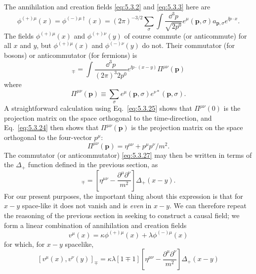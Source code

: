 The annihilation and creation fields \eqref{eq:5.3.2} and \eqref{eq:5.3.3} here are
\begin{equation}
  \phi^{(+)\mu}(x)=\phi^{(-)\mu\dagger}(x)
  =(2\pi)^{-3/2}\sum_\sigma\int\frac{\dd^3p}{\sqrt{2p^0}}
  e^\mu(\mathbf{p},\sigma)a_{\mathbf{p},\sigma}e^{\ii p\cdot x}.
  \tag{5.3.26}\label{eq:5.3.26}
\end{equation}
The fields $\phi^{(+)\mu}(x)$ and $\phi^{(+)\nu}(y)$ of course commute (or
anticommute) for all $x$ and $y$, but $\phi^{(+)\mu}(x)$ and
$\phi^{(-)\nu}(y)$ do not. Their commutator (for bosons) or anticommutator
(for fermions) is
\begin{equation}
  [\phi^{(+)\mu}(x),\phi^{(-)\nu}(y)]_\mp
  =\int\frac{\dd^3p}{(2\pi)^3 2p^0}e^{\ii p\cdot(x-y)}\Pi^{\mu\nu}(\mathbf{p})
  \tag{5.3.27}\label{eq:5.3.27}
\end{equation}
where
\begin{equation}
  \Pi^{\mu\nu}(\mathbf{p})\equiv\sum_\sigma
  e^\mu(\mathbf{p},\sigma)e^{\nu*}(\mathbf{p},\sigma).
  \tag{5.3.28}\label{eq:5.3.28}
\end{equation}
A straightforward calculation using Eq.~\eqref{eq:5.3.25} shows that
$\Pi^{\mu\nu}(0)$ is the projection matrix on the space orthogonal to the
time-direction, and Eq.~\eqref{eq:5.3.24} then shows that $\Pi^{\mu\nu}(\mathbf{p})$
is the projection matrix on the space orthogonal to the four-vector $p^\mu$:
\begin{equation}
  \Pi^{\mu\nu}(\mathbf{p})=\eta^{\mu\nu}+p^\mu p^\nu/m^2.
  \tag{5.3.29}\label{eq:5.3.29}
\end{equation}
The commutator (or anticommutator) \eqref{eq:5.3.27} may then be written in terms of
the $\Delta_+$ function defined in the previous section, as
\begin{equation}
  [\phi^{(+)\mu}(x),\phi^{(-)\nu}(y)]_\mp
  =\left[\eta^{\mu\nu}-\frac{\partial^\mu\partial^\nu}{m^2}\right]
  \Delta_+(x-y).
  \tag{5.3.30}\label{eq:5.3.30}
\end{equation}
For our present purposes, the important thing about this expression is that
for $x-y$ space-like it does not vanish and is \textit{even} in $x-y$. We can
therefore repeat the reasoning of the previous section in seeking to construct
a causal field; we form a linear combination of annihilation and creation fields
\[
  v^\mu(x)=\kappa\phi^{(+)\mu}(x)+\lambda\phi^{(-)\mu}(x)
\]
for which, for $x-y$ spacelike,
\[
  [v^\mu(x),v^\nu(y)]_\mp
  =\kappa\lambda[1\mp1]
  \left[\eta^{\mu\nu}-\frac{\partial^\mu\partial^\nu}{m^2}\right]
  \Delta_+(x-y)
\]
